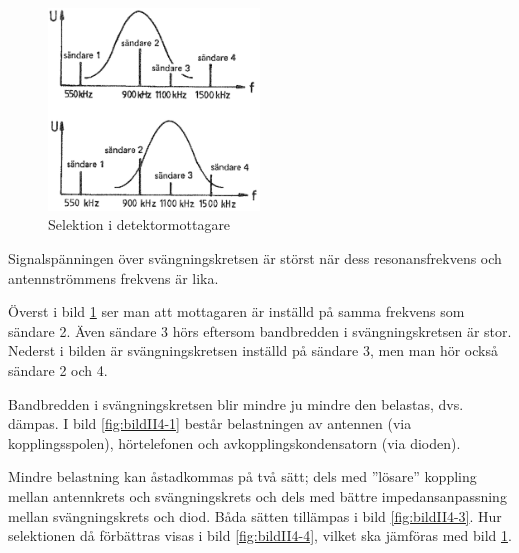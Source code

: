 \begin{figure}
  \includegraphics[width=0.5\textwidth]{images/cropped_pdfs/bild_2_4-02.pdf}
  \caption{Selektion i detektormottagare}
  \label{fig:bildII4-2}
\end{figure}

Signalspänningen över svängningskretsen är störst när dess
resonansfrekvens och antennströmmens frekvens är lika.

Överst i bild \ref{fig:bildII4-2} ser man att mottagaren är inställd på
samma frekvens som sändare 2.
Även sändare 3 hörs eftersom bandbredden i svängningskretsen är stor.
Nederst i bilden är svängningskretsen inställd på sändare 3, men man hör
också sändare 2 och 4.

Bandbredden i svängningskretsen blir mindre ju mindre den belastas,
dvs. dämpas.
I bild \ref{fig:bildII4-1} består belastningen av antennen (via
kopplingsspolen), hörtelefonen och avkopplingskondensatorn (via dioden).

Mindre belastning kan åstadkommas på två sätt; dels med ''lösare''
koppling mellan antennkrets och svängningskrets och dels med bättre
impedansanpassning mellan svängningskrets och diod. Båda sätten
tillämpas i bild \ref{fig:bildII4-3}. Hur selektionen då förbättras visas i
bild \ref{fig:bildII4-4}, vilket ska jämföras med bild \ref{fig:bildII4-2}.

